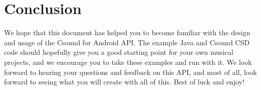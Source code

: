 \documentclass[11pt]{article}
\begin{document}
\section{Conclusion}

We hope that this document has helped you to become familiar with the design and usage of the Csound for Android API. The example Java and Csound CSD code should hopefully give you a good starting point for your own musical projects, and we encourage you to take these examples and run with it.  We look forward to hearing your questions and feedback on this API, and most of all, look forward to seeing what you will create with all of this.  Best of luck and enjoy! 
\end{document}
